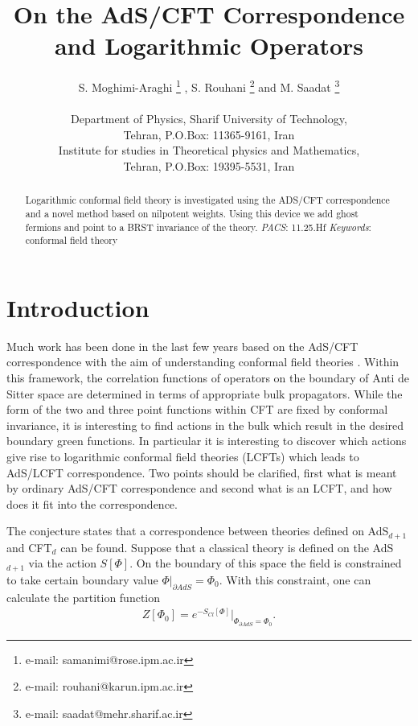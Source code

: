 \documentclass[a4paper,11pt]{article}
\begin{document}
\title{On the AdS/CFT Correspondence and Logarithmic Operators}
\author{S. Moghimi-Araghi \footnote{e-mail: samanimi@rose.ipm.ac.ir}
, S. Rouhani \footnote{e-mail: rouhani@karun.ipm.ac.ir} and M. Saadat
\footnote{e-mail: saadat@mehr.sharif.ac.ir}\\ \\ Department of
Physics, Sharif University of Technology,\\ Tehran, P.O.Box:
11365-9161, Iran\\ Institute for studies in Theoretical physics
and Mathematics,\\ Tehran, P.O.Box: 19395-5531, Iran}
\maketitle

\begin{abstract}
Logarithmic conformal field theory is investigated using the ADS/CFT correspondence
and a novel method based on nilpotent weights. Using this device we add
ghost fermions and point to a BRST invariance of the theory. \vspace{5mm}%
\newline
\textit{PACS}: 11.25.Hf \newline \textit{Keywords}: conformal
field theory
\end{abstract}

\section{Introduction}

Much work has been done in the last few years based on the AdS/CFT
correspondence with the aim of understanding conformal field
theories \cite {ADS}. Within this framework, the correlation
functions of operators on the boundary of Anti de Sitter space
are determined in terms of appropriate bulk propagators. While
the form of the two and three point functions within CFT are
fixed by conformal invariance, it is interesting to find actions
in the bulk which result in the desired boundary green functions.
In particular it is interesting to discover which actions give
rise to logarithmic conformal field theories (LCFTs) which leads
to AdS/LCFT correspondence. Two points should be clarified, first
what is meant by ordinary AdS/CFT correspondence and second what
is an LCFT, and how does it fit into the correspondence.

The conjecture states that a correspondence between theories
defined on AdS$_{d+1}$ and CFT$_{d}$ can be found. Suppose that a
classical theory is defined on the AdS$_{d+1}$ via the action
$S[\Phi]$. On the boundary of this space the field is constrained
to take certain boundary value ${\Phi|}_{\partial AdS} =\Phi_0$.
With this constraint, one can calculate the partition function
\begin{eqnarray}
Z[\Phi_0]={e^{-S_{Cl}[\Phi]}}|_{\Phi_{\partial AdS}=\Phi_0}.
\end{eqnarray}
\end{document}
